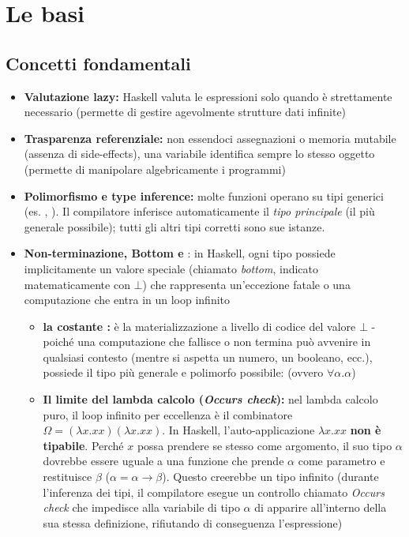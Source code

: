 \documentclass[a4paper,11pt]{report}
\begin{document}
\makecustomcover

\tableofcontents
\newpage

\chapter{Le basi}
\section{Concetti fondamentali}
\begin{itemize}
    \item \textbf{Valutazione lazy:} Haskell valuta le espressioni solo quando è strettamente necessario (permette di gestire agevolmente strutture dati infinite)
    \item \textbf{Trasparenza referenziale:} non essendoci assegnazioni o memoria mutabile (assenza di side-effects), una variabile identifica sempre lo stesso oggetto (permette di manipolare algebricamente i programmi)
    \item \textbf{Polimorfismo e type inference:} molte funzioni operano su tipi generici (es. , ). Il compilatore inferisce automaticamente il \textit{tipo principale} (il più generale possibile); tutti gli altri tipi corretti sono sue istanze.
\item \textbf{Non-terminazione, Bottom e }: in Haskell, ogni tipo possiede implicitamente un valore speciale (chiamato \textit{bottom}, indicato matematicamente con $\bot$) che rappresenta un'eccezione fatale o una computazione che entra in un loop infinito
    \begin{itemize}
        \item \textbf{la costante :} è la materializzazione a livello di codice del valore $\bot$ - poiché una computazione che fallisce o non termina può avvenire in qualsiasi contesto (mentre si aspetta un numero, un booleano, ecc.),  possiede il tipo più generale e polimorfo possibile:  (ovvero $\forall \alpha . \alpha$)
        \item \textbf{Il limite del lambda calcolo (\textit{Occurs check}):} nel lambda calcolo puro, il loop infinito per eccellenza è il combinatore $\Omega = (\lambda x.xx)(\lambda x.xx)$. In Haskell, l'auto-applicazione $\lambda x.xx$ \textbf{non è tipabile}. Perché $x$ possa prendere se stesso come argomento, il suo tipo $\alpha$ dovrebbe essere uguale a una funzione che prende $\alpha$ come parametro e restituisce $\beta$ ($\alpha = \alpha \to \beta$). Questo creerebbe un tipo infinito (durante l'inferenza dei tipi, il compilatore esegue un controllo chiamato \textit{Occurs check} che impedisce alla variabile di tipo $\alpha$ di apparire all'interno della sua stessa definizione, rifiutando di conseguenza l'espressione)

\end{itemize}
\end{itemize}
\end{document}
